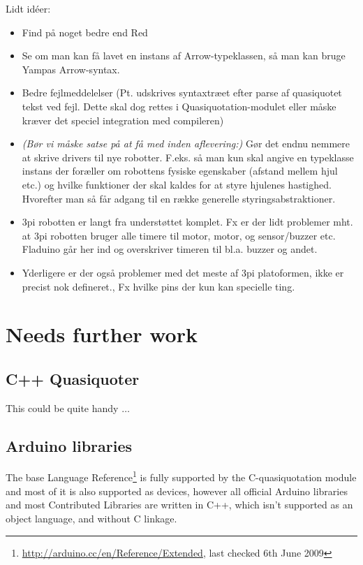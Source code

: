 \documentclass[a4paper, oneside, final]{memoir}
\begin{document}
Lidt idéer:
\begin{itemize}
\item Find på noget bedre end Red 
\item Se om man kan få lavet en instans af Arrow-typeklassen, så man
  kan bruge Yampas Arrow-syntax.
\item Bedre fejlmeddelelser (Pt. udskrives syntaxtræet efter parse af
  quasiquotet tekst ved fejl. Dette skal dog rettes i
  Quasiquotation-modulet eller måske kræver det speciel integration
  med compileren)
\item \textit{(Bør vi måske satse på at få med inden aflevering:)}
  Gør det endnu nemmere at skrive drivers til nye
  robotter. F.eks. så man kun skal angive en typeklasse instans der
  foræller om robottens fysiske egenskaber (afstand mellem hjul etc.)
  og hvilke funktioner der skal kaldes for at styre hjulenes
  hastighed. Hvorefter man så får adgang til en række generelle
  styringsabstraktioner.

\item 3pi robotten er langt fra understøttet komplet. Fx er der lidt problemer
  mht. at 3pi robotten bruger alle timere til motor, motor, og sensor/buzzer
  etc. Fladuino går her ind og overskriver timeren til bl.a. buzzer og andet.

\item  Yderligere er der også problemer med det meste af 3pi platoformen, ikke
  er precist nok defineret., Fx hvilke pins der kun kan specielle ting.
\end{itemize}

\section{Needs further work}


\subsection{C++ Quasiquoter}

This could be quite handy $\ldots$

\subsection{Arduino libraries}

The base Language
Reference\footnote{\url{http://arduino.cc/en/Reference/Extended}, last checked
  6th June 2009} is fully supported by the C-quasiquotation module and most of
it is also supported as devices, however all official Arduino libraries and most
Contributed Libraries are written in C++, which isn't supported as an object
language, and without C linkage. 
\end{document}
